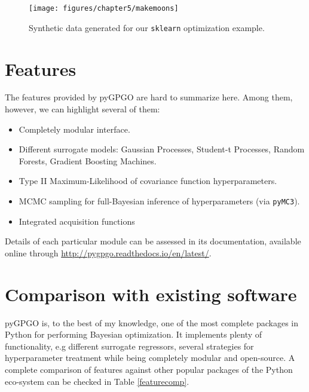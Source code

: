 \documentclass[10pt,a4paper,twoside]{book}
\begin{document}
\begin{figure}
\centering
\caption{Synthetic data generated for our \texttt{sklearn} optimization example.}
\texttt{[image: figures/chapter5/makemoons]}
\label{fig:makemoons}
\end{figure}




\section{Features}\label{features}

The features provided by pyGPGO are hard to summarize here. Among them, however, we can highlight several of them:

\begin{itemize}
\item Completely modular interface.
\item Different surrogate models: Gaussian Processes, Student-t Processes, Random Forests, Gradient Boosting Machines.
\item Type II Maximum-Likelihood of covariance function hyperparameters. 
\item MCMC sampling for full-Bayesian inference of hyperparameters (via \texttt{pyMC3}).
\item Integrated acquisition functions
\end{itemize}

Details of each particular module can be assessed in its documentation, available online through \url{http://pygpgo.readthedocs.io/en/latest/}.

\section{Comparison with existing software}

pyGPGO is, to the best of my knowledge, one of the most complete packages in Python for performing Bayesian optimization. It implements plenty of functionality, e.g different surrogate regressors, several strategies for hyperparameter treatment while being completely modular and open-source. A complete comparison of features against other popular packages of the Python eco-system can be checked in Table \ref{featurecomp}.

\newpage
\end{document}
